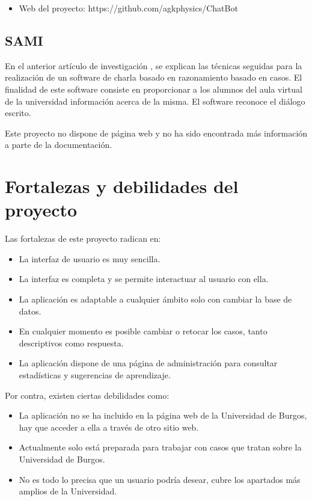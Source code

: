 \begin{itemize}
\tightlist
\item
Web del proyecto: https://github.com/agkphysics/ChatBot
\end{itemize}

\subsection{SAMI}

En el anterior artículo de investigación \cite{SAMI:project}, se explican las técnicas seguidas para la realización de un software de charla basado en razonamiento basado en casos. El finalidad de este software consiste en proporcionar a los alumnos del aula virtual de la universidad información acerca de la misma. El software reconoce el diálogo escrito.

Este proyecto no dispone de página web y no ha sido encontrada más información a parte de la documentación.

\section{Fortalezas y debilidades del proyecto}

Las fortalezas de este proyecto radican en:

\begin{itemize}
\tightlist
\item
La interfaz de usuario es muy sencilla.
\item
La interfaz es completa y se permite interactuar al usuario con ella.
\item
La aplicación es adaptable a cualquier ámbito solo con cambiar la base de datos.
\item
En cualquier momento es posible cambiar o retocar los casos, tanto descriptivos como respuesta.
\item
La aplicación dispone de una página de administración para consultar estadísticas y sugerencias de aprendizaje.
\end{itemize}

Por contra, existen ciertas debilidades como:

\begin{itemize}
\tightlist
\item
La aplicación no se ha incluido en la página web de la Universidad de Burgos, hay que acceder a ella a través de otro sitio web.
\item
Actualmente solo está preparada para trabajar con casos que tratan sobre la Universidad de Burgos.
\item
No es todo lo precisa que un usuario podría desear, cubre los apartados más amplios de la Universidad.
\end{itemize}

